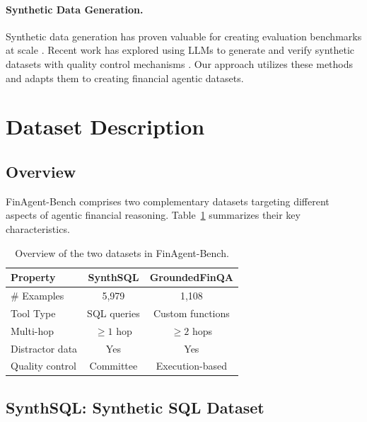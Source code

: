 \documentclass[11pt]{article}
\newcommand{\datasetname}{FinAgent-Bench\xspace}
\newcommand{\synthsubset}{SynthSQL\xspace}
\newcommand{\groundedfinqa}{GroundedFinQA\xspace}
\begin{document}
\paragraph{Synthetic Data Generation.}
Synthetic data generation has proven valuable for creating evaluation benchmarks at scale \citep{wang2022selfinstruct}. Recent work has explored using LLMs to generate and verify synthetic datasets with quality control mechanisms \citep{prabhakar2025apigenmt}. Our approach utilizes these methods and adapts them to creating financial agentic datasets.

\section{Dataset Description}

\subsection{Overview}

\datasetname comprises two complementary datasets targeting different aspects of agentic financial reasoning. Table~\ref{tab:dataset_overview} summarizes their key characteristics.

\begin{table}[t]
\centering
\small
\setlength{\tabcolsep}{6pt}
\begin{tabular}{lcc}
\toprule
\textbf{Property}   & \textbf{\synthsubset}   & \textbf{\groundedfinqa}   \\
\midrule
\# Examples         & 5{,}979                 & 1{,}108                    \\
Tool Type           & SQL queries             & Custom functions           \\
Multi-hop           & $\geq 1$ hop            & $\geq 2$ hops              \\
Distractor data     & Yes                     & Yes                        \\
Quality control     & Committee               & Execution-based            \\
\bottomrule
\end{tabular}
\caption{Overview of the two datasets in \datasetname.}
\label{tab:dataset_overview}
\end{table}

\subsection{\synthsubset: Synthetic SQL Dataset}
\label{sec:synthsql}
\end{document}
